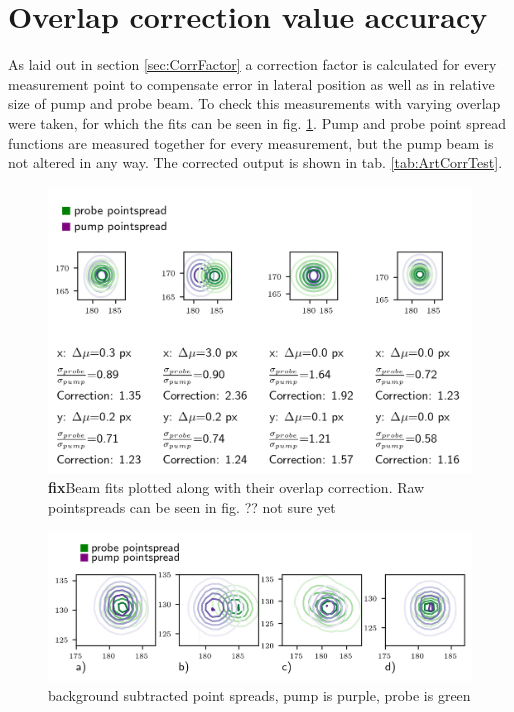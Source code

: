 \documentclass[twoside,openright]{scrreprt}
\begin{document}
\section{Overlap correction value accuracy}
As laid out in section \ref{sec:CorrFactor} a correction factor is calculated for every measurement point to compensate error in lateral position as well as in relative size of pump and probe beam.
To check this measurements with varying overlap were taken, for which the fits can be seen in fig. \ref{fig:correctionComparison}.
Pump and probe point spread functions are measured together for every measurement, but the pump beam is not altered in any way. The corrected output is shown in tab. \ref{tab:ArtCorrTest}. 
\begin{figure}[!h]
\centering
\includegraphics[width=\linewidth]{images/CorrectionComparison.png}
\caption{\textbf{fix}Beam fits plotted along with their overlap correction. Raw pointspreads can be seen in fig. ?? not sure yet\label{fig:correctionComparison}}
\end{figure}

\begin{figure}[hbp]
\centering
\includegraphics[scale=1]{images/CompensationTestRaw.png}
\caption{background subtracted point spreads, pump is purple, probe is green}
\end{figure}
\end{document}
